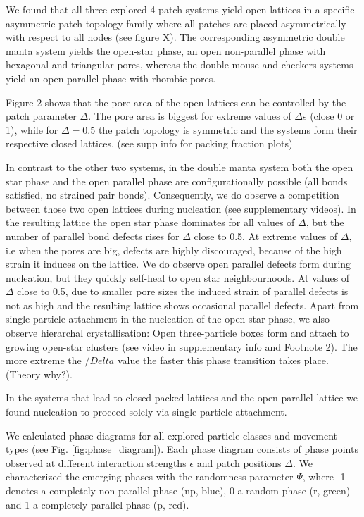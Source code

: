 \documentclass[a4paper,preprint]{revtex4}
\begin{document}
We found that all three explored 4-patch systems yield open lattices in a specific asymmetric patch topology family where all patches are placed asymmetrically with respect to all nodes (see figure X). 
The corresponding asymmetric double manta system yields the open-star phase, an open non-parallel phase with hexagonal and triangular pores, whereas the double mouse and checkers systems yield an open parallel phase with rhombic pores. 

Figure 2 shows that the pore area of the open lattices can be controlled by the patch parameter $\Delta$.
The pore area is biggest for extreme values of $\Delta$s  (close  0 or 1), while for  $\Delta = 0.5$  the patch topology is symmetric and the systems form their respective closed lattices. (see supp info for packing fraction plots) 

In contrast to the other two systems, in the double manta system both the open star phase and the open parallel phase 
are configurationally possible (all bonds satisfied, no strained pair bonds). Consequently, we do observe a competition between those two open lattices during nucleation (see supplementary videos).
In the resulting lattice the open star phase dominates for all values of $\Delta$, but the number of parallel bond defects rises for $\Delta$ close to 0.5.
At extreme values of $\Delta$, i.e when the pores are big, defects are highly discouraged, because of the high strain it induces on the lattice. 
We do observe open parallel defects form during nucleation, but they quickly self-heal to open star neighbourhoods.
At values of $\Delta$ close to 0.5, due to smaller pore sizes the induced strain of parallel defects is not as high and the resulting lattice 
shows occasional parallel defects. 
Apart from single particle attachment in the nucleation of the open-star phase, we also observe hierarchal crystallisation: 
Open three-particle boxes form and attach to growing open-star clusters (see video in supplementary info and Footnote 2).
The more extreme the $/Delta$ value the faster this phase transition takes place. (Theory why?).

In the systems that lead to closed packed lattices and the open parallel lattice we found nucleation to proceed solely via single particle attachment. 


We calculated phase diagrams for all explored particle classes and movement types (see Fig. \ref{fig:phase_diagram}).
Each phase diagram consists of phase points observed at different interaction strengths $\epsilon$ and patch positions $\Delta$.
We characterized the emerging phases with the randomness parameter $\Psi$, where -1 denotes a completely non-parallel phase (np, blue), 0 a random phase (r, green) and 1 a completely parallel phase (p, red).  
\end{document}

